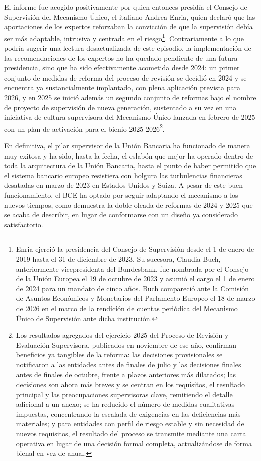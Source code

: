 \documentclass[10pt,a4paper]{article}
\newcounter{anexo}
\begin{document}
{El informe fue acogido positivamente por quien entonces presidía el Consejo de Supervisión del Mecanismo Único, el italiano Andrea Enria, quien declaró que las aportaciones de los expertos reforzaban la convicción de que la supervisión debía ser más adaptable, intrusiva y centrada en el riesgo\footnote{%
    Enria ejerció la presidencia del Consejo de Supervisión desde el 1 de enero de 2019 hasta el 31 de diciembre de 2023. Su sucesora, Claudia Buch, anteriormente vicepresidenta del Bundesbank, fue nombrada por el Consejo de la Unión Europea el 19 de octubre de 2023 y asumió el cargo el 1 de enero de 2024 para un mandato de cinco años. Buch compareció ante la Comisión de Asuntos Económicos y Monetarios del Parlamento Europeo el 18 de marzo de 2026 en el marco de la rendición de cuentas periódica del Mecanismo Único de Supervisión ante dicha institución.
}. Contrariamente a lo que podría sugerir una lectura desactualizada de este episodio, la implementación de las recomendaciones de los expertos no ha quedado pendiente de una futura presidencia, sino que ha sido efectivamente acometida desde 2024: un primer conjunto de medidas de reforma del proceso de revisión se decidió en 2024 y se encuentra ya sustancialmente implantado, con plena aplicación prevista para 2026, y en 2025 se inició además un segundo conjunto de reformas bajo el nombre de proyecto de supervisión de nueva generación, sustentado a su vez en una iniciativa de cultura supervisora del Mecanismo Único lanzada en febrero de 2025 con un plan de activación para el bienio 2025-2026\footnote{%
    Los resultados agregados del ejercicio 2025 del Proceso de Revisión y Evaluación Supervisora, publicados en noviembre de ese año, confirman beneficios ya tangibles de la reforma: las decisiones provisionales se notificaron a las entidades antes de finales de julio y las decisiones finales antes de finales de octubre, frente a plazos anteriores más dilatados; las decisiones son ahora más breves y se centran en los requisitos, el resultado principal y las preocupaciones supervisoras clave, remitiendo el detalle adicional a un anexo; se ha reducido el número de medidas cualitativas impuestas, concentrando la escalada de exigencias en las deficiencias más materiales; y para entidades con perfil de riesgo estable y sin necesidad de nuevos requisitos, el resultado del proceso se transmite mediante una carta operativa en lugar de una decisión formal completa, actualizándose de forma bienal en vez de anual.
}.

En definitiva, el pilar supervisor de la Unión Bancaria ha funcionado de manera muy exitosa y ha sido, hasta la fecha, el eslabón que mejor ha operado dentro de toda la arquitectura de la Unión Bancaria, hasta el punto de haber permitido que el sistema bancario europeo resistiera con holgura las turbulencias financieras desatadas en marzo de 2023 en Estados Unidos y Suiza. A pesar de este buen funcionamiento, el BCE ha optado por seguir adaptando el mecanismo a los nuevos tiempos, como demuestra la doble oleada de reformas de 2024 y 2025 que se acaba de describir, en lugar de conformarse con un diseño ya considerado satisfactorio.

}
\end{document}
